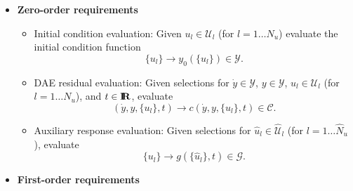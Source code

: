 \documentclass[pdf,ps2pdf,11pt]{SANDreport}
\begin{document}
\begin{itemize}

\item\textbf{Zero-order requirements}

\begin{itemize}
%
{}\item Initial condition evaluation: Given $u_l\in\mathcal{U}_l$ (for
$l=1\ldots{}N_u$) evaluate the initial condition function
\[
\{u_l\} {}\rightarrow y_0(\{u_l\})\in\mathcal{Y}.
\]
%
{}\item DAE residual evaluation: Given selections for $\dot{y}\in\mathcal{Y}$,
$y\in\mathcal{Y}$, $u_l\in\mathcal{U}_l$ (for $l=1\ldots{}N_u$), and
$t\in\mbox{\textbf{I}}\hspace{-0.6ex}\mbox{\textbf{R}}$, evaluate
\[
(\dot{y},y,\{u_l\},t) {}\rightarrow c(\dot{y},y,\{u_l\},t)\in\mathcal{C}.
\]
%
{}\item Auxiliary response evaluation: Given selections for
$\hat{u}_l\in\hat{\mathcal{U}}_l$ (for $l=1\ldots{}\hat{N}_u$), evaluate
\[
\{u_l\} {}\rightarrow g(\{\hat{u}_l\},t)\in\mathcal{G}.
\]
%
\end{itemize}

\item\textbf{First-order requirements}


\end{itemize}
\end{document}
